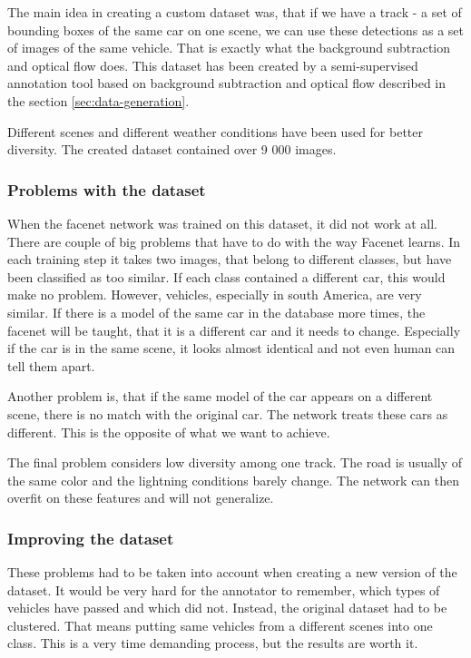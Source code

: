 \documentclass[a4paper,12pt,titlepage, twoside]{article}
\numberwithin{figure}{section}
\begin{document}
The main idea in creating a custom dataset was, that if we have a track - a set of bounding boxes of the same car on one scene, we can use these detections as a set of images of the same vehicle. That is exactly what the background subtraction and optical flow does. This dataset has been created by a semi-supervised annotation tool based on background subtraction and optical flow described in the section \ref{sec:data-generation}.

Different scenes and different weather conditions have been used for better diversity. The created dataset contained over 9 000 images.

\subsubsection{Problems with the dataset}
When the facenet network was trained on this dataset, it did not work at all. There are couple of big problems that have to do with the way Facenet learns. In each training step it takes two images, that belong to different classes, but have been classified as too similar. If each class contained a different car, this would make no problem. However, vehicles, especially in south America, are very similar. If there is a model of the same car in the database more times, the facenet will be taught, that it is a different car and it needs to change. Especially if the car is in the same scene, it looks almost identical and not even human can tell them apart. 

Another problem is, that if the same model of the car appears on a different scene, there is no match with the original car. The network treats these cars as different. This is the opposite of what we want to achieve.

The final problem considers low diversity among one track. The road is usually of the same color and the lightning conditions barely change. The network can then overfit on these features and will not generalize.

\subsubsection{Improving the dataset}
These problems had to be taken into account when creating a new version of the dataset. It would be very hard for the annotator to remember, which types of vehicles have passed and which did not. Instead, the original dataset had to be clustered. That means putting same vehicles from a different scenes into one class. This is a very time demanding process, but the results are worth it.
\end{document}
